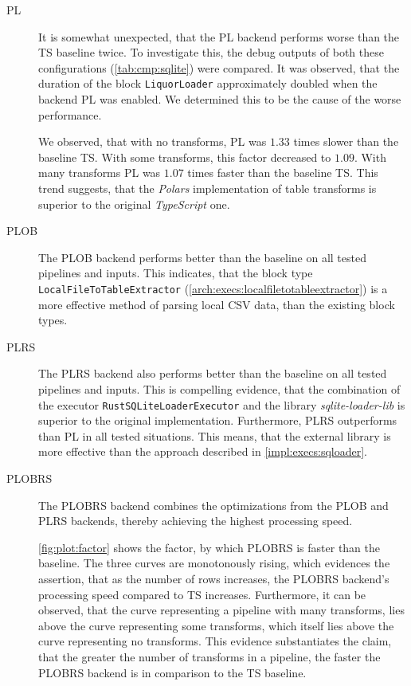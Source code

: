 \begin{description}
	\item[PL] It is somewhat unexpected, that the PL backend performs worse than the TS baseline twice.
	      To investigate this, the debug outputs of both these configurations (\autoref{tab:cmp:sqlite}) were compared.
	      It was observed, that the duration of the block \Verb|LiquorLoader| approximately doubled when the backend PL was enabled.
	      We determined this to be the cause of the worse performance.

	      We observed, that with no transforms, PL was $1.33$ times slower than the baseline TS.
	      With some transforms, this factor decreased to $1.09$.
	      With many transforms PL was $1.07$ times faster than the baseline TS.
	      This trend suggests, that the \emph{Polars} implementation of table transforms is superior to the original \emph{TypeScript} one.

	\item[PLOB] The PLOB backend performs better than the baseline on all tested pipelines and inputs.
	      This indicates, that the block type \Verb|LocalFileToTableExtractor| (\autoref{arch:execs:localfiletotableextractor}) is a more effective method of parsing local \ac{CSV} data, than the existing block types.

	\item[PLRS] The PLRS backend also performs better than the baseline on all tested pipelines and inputs.
	      This is compelling evidence, that the combination of the executor \Verb|RustSQLiteLoaderExecutor| and the library \emph{sqlite-loader-lib} is superior to the original implementation.
	      Furthermore, PLRS outperforms than PL in all tested situations.
	      This means, that the external library is more effective than the approach described in \autoref{impl:execs:sqloader}.

	\item[PLOBRS] The PLOBRS backend combines the optimizations from the PLOB and PLRS backends, thereby achieving the highest processing speed.

	      \autoref{fig:plot:factor} shows the factor, by which PLOBRS is faster than the baseline.
	      The three curves are monotonously rising, which evidences the assertion, that as the number of rows increases, the PLOBRS backend's processing speed compared to TS increases.
	      Furthermore, it can be observed, that the curve representing a pipeline with many transforms, lies above the curve representing some transforms, which itself lies above the curve representing
	      no transforms.
	      This evidence substantiates the claim, that the greater the number of transforms in a pipeline, the faster the PLOBRS backend is in comparison to the TS baseline.
\end{description}

